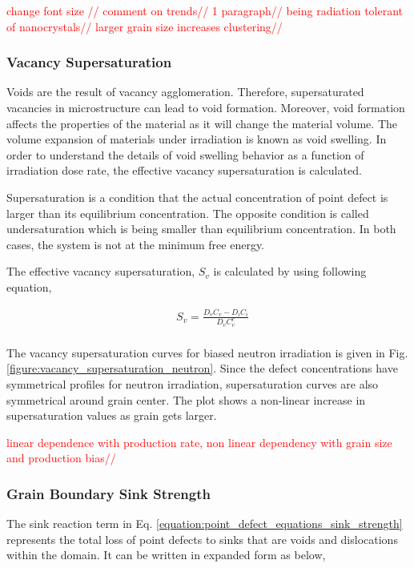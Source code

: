 \documentclass[utf8]{frontiersSCNS} %
\begin{document}
\textcolor{red}{
change font size //
comment on trends//
1 paragraph//
being radiation tolerant of nanocrystals//
larger grain size increases clustering//
}
\\
\subsubsection{Vacancy Supersaturation}
    Voids are the result of vacancy agglomeration. Therefore,  supersaturated vacancies in microstructure can lead to void formation. Moreover, void formation affects the properties of the material as it will change the material volume. The volume expansion of materials under irradiation is known as void swelling. In order to understand the details of void swelling behavior as a function of irradiation dose rate, the effective vacancy supersaturation is calculated.

    Supersaturation is a condition that the actual concentration of point defect is larger than its equilibrium concentration. The opposite condition is called undersaturation which is being smaller than equilibrium concentration. In both cases, the system is not at the minimum free energy.

    The effective vacancy supersaturation, ${S_v}$ is calculated by using following equation, \citep{was2017}

    \begin{equation}
        \begin{aligned}
        &S_v=\frac{D_vC_v-D_iC_i}{D_vC_v^e}\\
        \end{aligned}
    \end{equation}

    The vacancy supersaturation curves for biased neutron irradiation is given in Fig. \ref{figure:vacancy_supersaturation_neutron}. Since the defect concentrations have symmetrical profiles for neutron irradiation, supersaturation curves are also symmetrical around grain center. The plot shows a non-linear increase in supersaturation values as grain gets larger.

\textcolor{red}{
linear dependence with production rate, non linear dependency with grain size and production bias//
}

    \newpage
    \subsubsection{Grain Boundary Sink Strength}
    The sink reaction term in Eq. \ref{equation:point_defect_equations_sink_strength} represents the total loss of point defects to sinks that are voids and dislocations within the domain. It can be written in expanded form as below,
\end{document}

